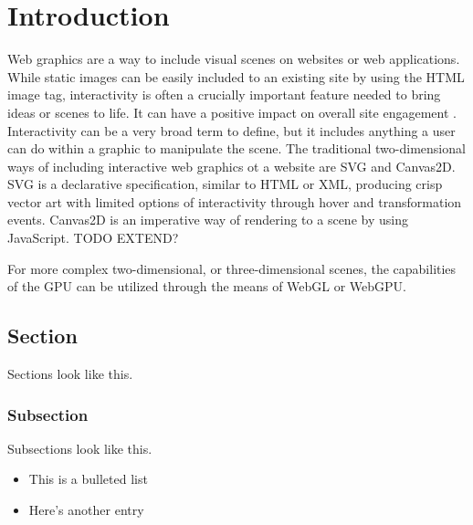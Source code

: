 %
%
% 
% 


\chapter{Introduction}

\label{chap:Intro}
Web graphics are a way to include visual scenes on websites or web applications.
While static images can be easily included to an existing site by using the HTML image tag,
interactivity is often a crucially important feature needed to bring ideas or scenes to life.
It can have a positive impact on overall site engagement \parencite{web-engagement-literature}.
Interactivity can be a very broad term to define, but it includes anything a user can do within
a graphic to manipulate the scene. The traditional two-dimensional ways of including interactive
web graphics ot a website are SVG and Canvas2D.
SVG is a declarative specification, similar to HTML or XML, producing crisp vector art with
limited options of interactivity through hover and transformation events.
Canvas2D is an imperative way of rendering to a scene by using JavaScript. TODO EXTEND?

For more complex two-dimensional, or three-dimensional scenes, the capabilities of the GPU can be utilized
through the means of WebGL or WebGPU.


% 

\section{Section}
Sections look like this.

\subsection{Subsection}
Subsections look like this.

\begin{itemize}
\item This is a bulleted list
\item Here's another entry
\end{itemize}
